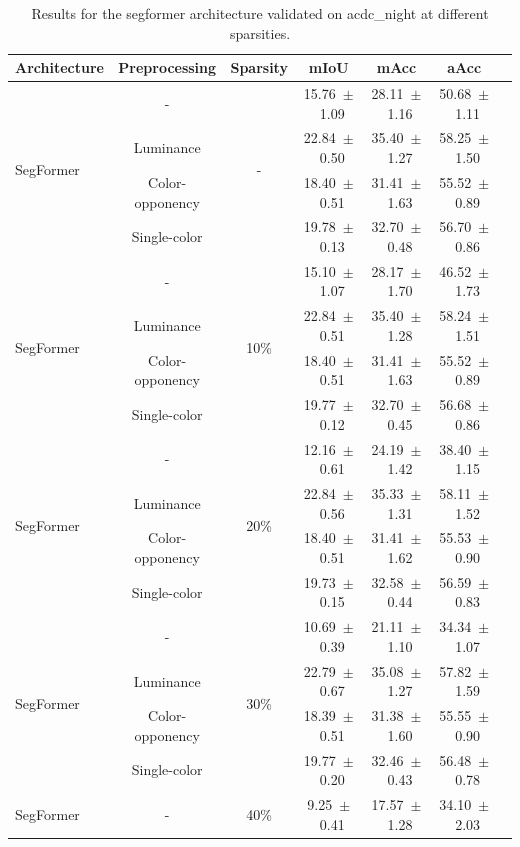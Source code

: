 \begin{table}[h]
\centering
\caption{Results for the segformer architecture validated on acdc_night at different sparsities.}
\begin{tabular}{@{}lccc ccc@{}}
\toprule
Architecture & Preprocessing & Sparsity & mIoU & mAcc & aAcc \\
\midrule

\multirow{4}{*}{SegFormer} & - & \multirow{4}{*}{-} & 15.76~$\pm$~1.09 & 28.11~$\pm$~1.16 & 50.68~$\pm$~1.11 \\
& Luminance & & 22.84~$\pm$~0.50 & 35.40~$\pm$~1.27 & 58.25~$\pm$~1.50 \\
& Color-opponency & & 18.40~$\pm$~0.51 & 31.41~$\pm$~1.63 & 55.52~$\pm$~0.89 \\
& Single-color & & 19.78~$\pm$~0.13 & 32.70~$\pm$~0.48 & 56.70~$\pm$~0.86 \\
\midrule
\multirow{4}{*}{SegFormer} & - & \multirow{4}{*}{10\%} & 15.10~$\pm$~1.07 & 28.17~$\pm$~1.70 & 46.52~$\pm$~1.73 \\
& Luminance & & 22.84~$\pm$~0.51 & 35.40~$\pm$~1.28 & 58.24~$\pm$~1.51 \\
& Color-opponency & & 18.40~$\pm$~0.51 & 31.41~$\pm$~1.63 & 55.52~$\pm$~0.89 \\
& Single-color & & 19.77~$\pm$~0.12 & 32.70~$\pm$~0.45 & 56.68~$\pm$~0.86 \\
\midrule
\multirow{4}{*}{SegFormer} & - & \multirow{4}{*}{20\%} & 12.16~$\pm$~0.61 & 24.19~$\pm$~1.42 & 38.40~$\pm$~1.15 \\
& Luminance & & 22.84~$\pm$~0.56 & 35.33~$\pm$~1.31 & 58.11~$\pm$~1.52 \\
& Color-opponency & & 18.40~$\pm$~0.51 & 31.41~$\pm$~1.62 & 55.53~$\pm$~0.90 \\
& Single-color & & 19.73~$\pm$~0.15 & 32.58~$\pm$~0.44 & 56.59~$\pm$~0.83 \\
\midrule
\multirow{4}{*}{SegFormer} & - & \multirow{4}{*}{30\%} & 10.69~$\pm$~0.39 & 21.11~$\pm$~1.10 & 34.34~$\pm$~1.07 \\
& Luminance & & 22.79~$\pm$~0.67 & 35.08~$\pm$~1.27 & 57.82~$\pm$~1.59 \\
& Color-opponency & & 18.39~$\pm$~0.51 & 31.38~$\pm$~1.60 & 55.55~$\pm$~0.90 \\
& Single-color & & 19.77~$\pm$~0.20 & 32.46~$\pm$~0.43 & 56.48~$\pm$~0.78 \\
\midrule
\multirow{4}{*}{SegFormer} & - & \multirow{4}{*}{40\%} & 9.25~$\pm$~0.41 & 17.57~$\pm$~1.28 & 34.10~$\pm$~2.03 \\

\end{tabular}
\end{table}
